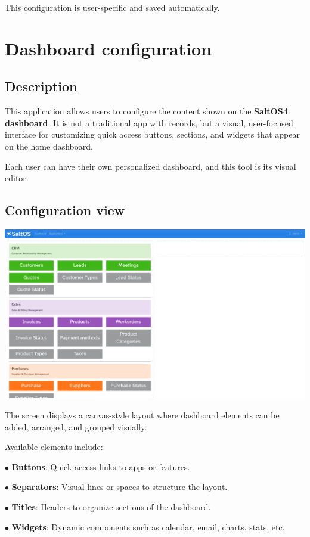 \documentclass[a4paper]{article}
\begin{document}
This configuration is user-specific and saved automatically.


\hypertarget{toc85}{}
\section{Dashboard configuration}

\hypertarget{toc86}{}
\subsection{Description}

This application allows users to configure the content shown on the \textbf{SaltOS4 dashboard}.
It is not a traditional app with records, but a visual, user-focused interface for customizing quick access buttons, sections, and widgets that appear on the home dashboard.

Each user can have their own personalized dashboard, and this tool is its visual editor.

\hypertarget{toc87}{}
\subsection{Configuration view}

\begin{center}\includegraphics[width=1\textwidth]{../ujest/snaps/test-screenshots-js-screenshots-dashboard-dashboard-widgets-en-us-1-snap.png}\end{center}

The screen displays a canvas-style layout where dashboard elements can be added, arranged, and grouped visually.

Available elements include:

\begin{compactitem}
\item[\color{myblue}$\bullet$] \textbf{Buttons}: Quick access links to apps or features.
\item[\color{myblue}$\bullet$] \textbf{Separators}: Visual lines or spaces to structure the layout.
\item[\color{myblue}$\bullet$] \textbf{Titles}: Headers to organize sections of the dashboard.
\item[\color{myblue}$\bullet$] \textbf{Widgets}: Dynamic components such as calendar, email, charts, stats, etc.
\end{compactitem}
\end{document}
